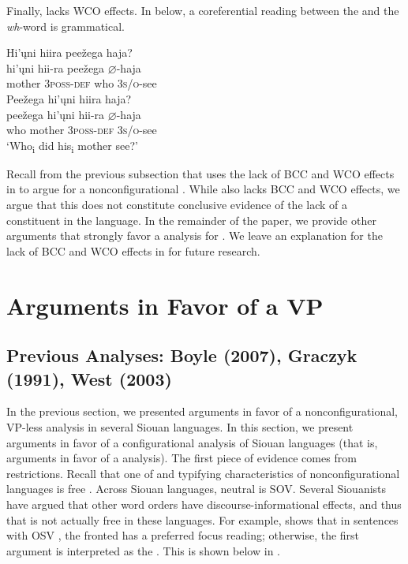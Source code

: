 \documentclass[output=paper]{LSP/langsci}
\begin{document}
Finally,  lacks WCO effects. In  below, a coreferential reading between the  and the  \textit{wh}-word is grammatical.

\begin{exe}
\ex\label{ex:jrs:21}
\begin{xlist} 	
\ex
\glll Hi'\k{u}ni		hiira					pee\v{z}ega		haja? \\
hi'\k{u}ni		hii-ra 			pee\v{z}ega		$\varnothing$-haja \\
	mother		3\textsc{poss-def}		who	\textsc{3s/o}-see \\ 
    
\ex
\glll Pee\v{z}ega 	hi'\k{u}ni 		hiira		haja?\\
pee\v{z}ega 	hi'\k{u}ni 		hii-ra 		$\varnothing$-haja \\
	who 	mother 	3\textsc{poss-def} 	\textsc{3s/o}-see \\
\trans `Who\textsubscript{i} did his\textsubscript{i} mother see?'
\end{xlist}
\end{exe}

Recall from the previous subsection that \citet{VanValin1985,VanValin1987} uses the lack of BCC and WCO effects in  to argue for a nonconfigurational . While  also lacks BCC and WCO effects, we argue that this does not constitute conclusive evidence of the lack of a  constituent in the language. In the remainder of the paper, we provide other arguments that strongly favor a  analysis for . We leave an explanation for the lack of BCC and WCO effects in  for future research.

\section{Arguments in Favor of a VP}\label{sec:jrs:3}

\subsection{Previous Analyses: Boyle (2007), Graczyk (1991), West (2003)}

In the previous section, we presented arguments in favor of a nonconfigurational, VP-less analysis in several Siouan languages.  In this section, we present arguments in favor of a configurational analysis of Siouan languages (that is, arguments in favor of a  analysis).  The first piece of evidence comes from  restrictions. Recall that one of  and  typifying characteristics of nonconfigurational languages is free .  Across Siouan languages, neutral  is SOV.  Several Siouanists have argued that other word orders have discourse-informational effects, and thus that  is not actually free in these languages. For example, \citet{West2003} shows that in  sentences with OSV , the fronted  has a preferred focus reading; otherwise, the first argument is interpreted as the . This is shown below in . 
\end{document}
